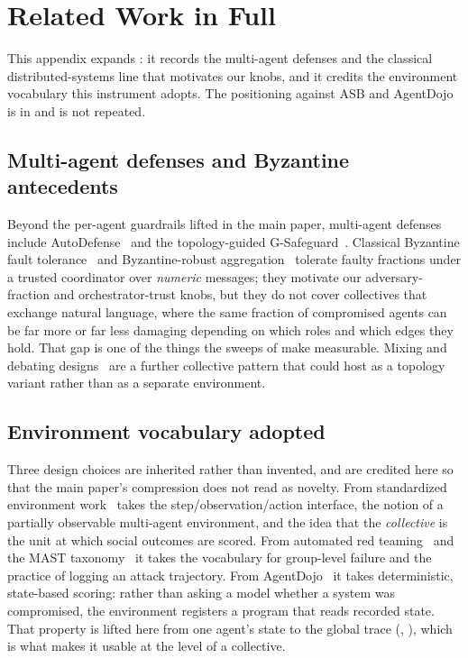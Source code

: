 \section{Related Work in Full}
\label{app:related-full}

This appendix expands : it records the multi-agent defenses and the
classical distributed-systems line that motivates our knobs, and it credits the environment
vocabulary this instrument adopts. The positioning against ASB and AgentDojo is in
 and is not repeated.

\subsection{Multi-agent defenses and Byzantine antecedents}
Beyond the per-agent guardrails lifted in the main paper, multi-agent defenses include
AutoDefense~\cite{zeng2024autodefense} and the topology-guided
G-Safeguard~\cite{yu2025gsafeguard}. Classical Byzantine fault
tolerance~\cite{lamport1982byzantine,pease1980reaching} and Byzantine-robust
aggregation~\cite{blanchard2017krum} tolerate faulty fractions under a trusted coordinator
over \emph{numeric} messages; they motivate our adversary-fraction and orchestrator-trust
knobs, but they do not cover collectives that exchange natural language, where the same
fraction of compromised agents can be far more or far less damaging depending on which roles
and which edges they hold. That gap is one of the things the sweeps of
 make measurable. Mixing and debating
designs~\cite{du2023debate} are a further collective pattern that  could host as a
topology variant rather than as a separate environment.

\subsection{Environment vocabulary adopted}
Three design choices are inherited rather than invented, and are credited here so that the
main paper's compression does not read as novelty. From standardized environment
work~\cite{brockman2016openaigym,terry2021pettingzoo,leibo2021meltingpot}  takes the
step/observation/action interface, the notion of a partially observable multi-agent
environment, and the idea that the \emph{collective} is the unit at which social outcomes are
scored. From automated red teaming~\cite{perez2022redteaming} and the MAST
taxonomy~\cite{cemri2025mast} it takes the vocabulary for group-level failure and the practice
of logging an attack trajectory. From AgentDojo~\cite{debenedetti2024agentdojo} it takes
deterministic, state-based scoring: rather than asking a model whether a system was
compromised, the environment registers a program that reads recorded state. That property is
lifted here from one agent's state to the global trace (,
), which is what makes it usable at the level of a collective.

